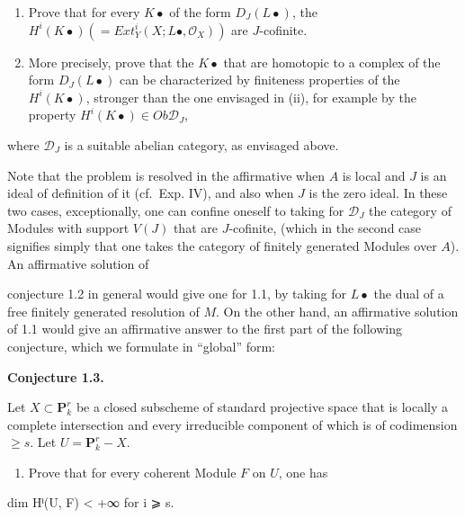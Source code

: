 \documentclass[
]{article}
\newenvironment{Shaded}{}{}
\newcommand{\NormalTok}[1]{#1}
\providecommand{\tightlist}{%
  \setlength{\itemsep}{0pt}\setlength{\parskip}{0pt}}
\begin{document}
\begin{enumerate}
\def\labelenumi{(\roman{enumi})}
\setcounter{enumi}{1}
\item
  Prove that for every \(K\bullet\) of the form \(D_{J}(L\bullet)\), the
  \(H^{i}(K\bullet) (= Ext^{i}_{Y}(X; L\bullet, \mathcal{O}_{X}))\) are
  \(J\)-cofinite.
\item
  More precisely, prove that the \(K\bullet\) that are homotopic to a
  complex of the form \(D_{J}(L\bullet)\) can be characterized by
  finiteness properties of the \(H^{i}(K\bullet)\), stronger than the
  one envisaged in (ii), for example by the property
  \(H^{i}(K\bullet) \in Ob \mathcal{D}_{J}\),
\end{enumerate}

where \(\mathcal{D}_{J}\) is a suitable abelian category, as envisaged
above.

Note that the problem is resolved in the affirmative when \(A\) is local
and \(J\) is an ideal of definition of it (cf.~Exp. IV), and also when
\(J\) is the zero ideal. In these two cases, exceptionally, one can
confine oneself to taking for \(\mathcal{D}_{J}\) the category of
Modules with support \(V(J)\) that are \(J\)-cofinite, (which in the
second case signifies simply that one takes the category of finitely
generated Modules over \(A\)). An affirmative solution of

conjecture 1.2 in general would give one for 1.1, by taking for
\(L\bullet\) the dual of a free finitely generated resolution of \(M\).
On the other hand, an affirmative solution of 1.1 would give an
affirmative answer to the first part of the following conjecture, which
we formulate in ``global'' form:

\textbf{Conjecture 1.3.}

Let \(X \subset \mathbf{P}^{r}_{k}\) be a closed subscheme of standard
projective space that is locally a complete intersection and every
irreducible component of which is of codimension \(\geqslant s\). Let
\(U = \mathbf{P}^{r}_{k} - X\).

\begin{enumerate}
\def\labelenumi{(\roman{enumi})}
\tightlist
\item
  Prove that for every coherent Module \(F\) on \(U\), one has
\end{enumerate}

\begin{Shaded}
\begin{Highlighting}[]
\NormalTok{dim Hⁱ(U, F) \textless{} +∞   for i ⩾ s.}
\end{Highlighting}
\end{Shaded}
\end{document}
